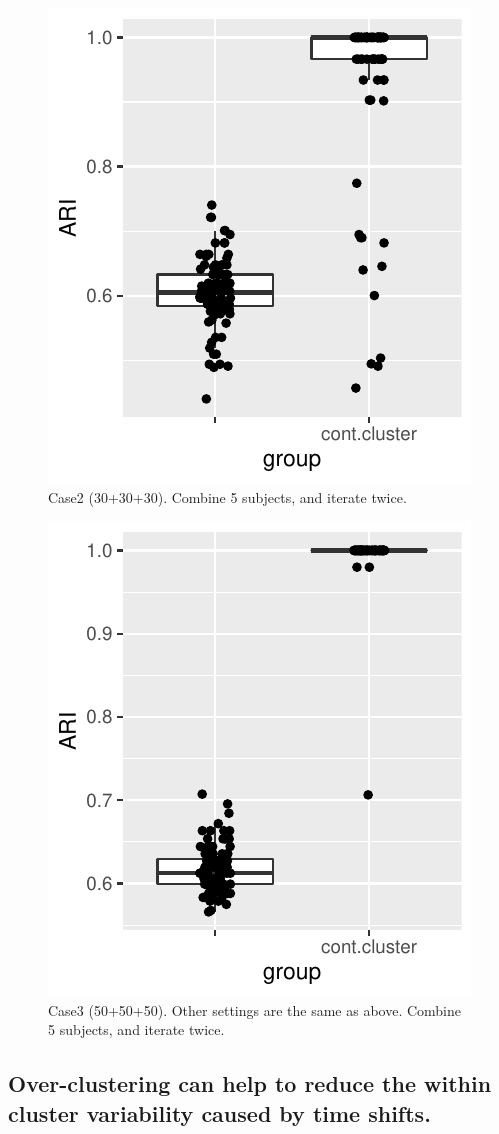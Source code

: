 \begin{figure}[H]
\includegraphics[width=.5\textwidth]{../simulation/plots/case2_cont_cluster}
\caption{Case2 (30+30+30). Combine 5 subjects, and iterate twice.}
\end{figure}


\begin{figure}[H]
\includegraphics[width=.5\textwidth]{../simulation/plots/case3_cont_cluster}
\caption{Case3 (50+50+50). Other settings are the same as above. Combine 5 subjects, and iterate twice.}
\end{figure}




\subsection*{Over-clustering can help to reduce the within cluster variability caused by time shifts.}

